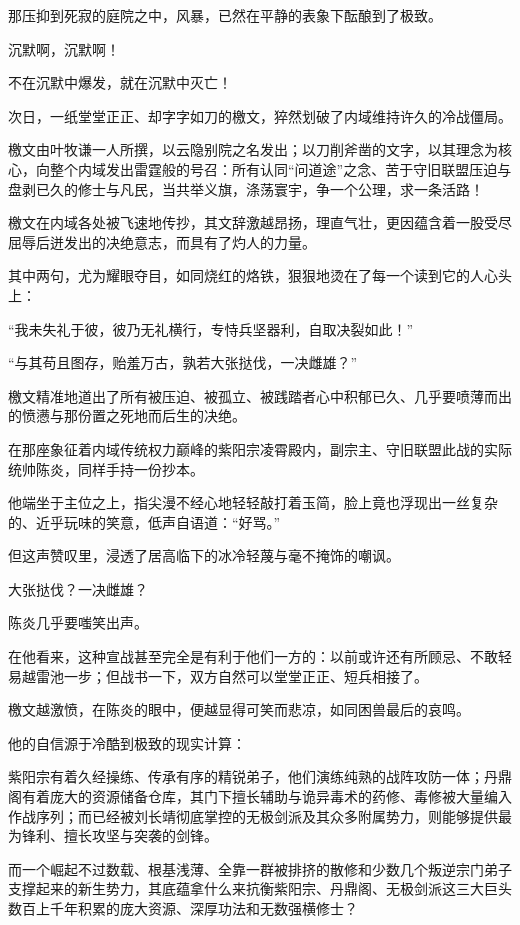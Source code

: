 那压抑到死寂的庭院之中，风暴，已然在平静的表象下酝酿到了极致。

沉默啊，沉默啊！

不在沉默中爆发，就在沉默中灭亡！

\vspace{2em}

次日，一纸堂堂正正、却字字如刀的檄文，猝然划破了内域维持许久的冷战僵局。

檄文由叶牧谦一人所撰，以云隐别院之名发出；以刀削斧凿的文字，以其理念为核心，向整个内域发出雷霆般的号召：所有认同“问道途”之念、苦于守旧联盟压迫与盘剥已久的修士与凡民，当共举义旗，涤荡寰宇，争一个公理，求一条活路！

檄文在内域各处被飞速地传抄，其文辞激越昂扬，理直气壮，更因蕴含着一股受尽屈辱后迸发出的决绝意志，而具有了灼人的力量。

其中两句，尤为耀眼夺目，如同烧红的烙铁，狠狠地烫在了每一个读到它的人心头上：

“我未失礼于彼，彼乃无礼横行，专恃兵坚器利，自取决裂如此！”

“与其苟且图存，贻羞万古，孰若大张挞伐，一决雌雄？”

檄文精准地道出了所有被压迫、被孤立、被践踏者心中积郁已久、几乎要喷薄而出的愤懑与那份置之死地而后生的决绝。

\vspace{2em}

在那座象征着内域传统权力巅峰的紫阳宗凌霄殿内，副宗主、守旧联盟此战的实际统帅陈炎，同样手持一份抄本。

他端坐于主位之上，指尖漫不经心地轻轻敲打着玉简，脸上竟也浮现出一丝复杂的、近乎玩味的笑意，低声自语道：“好骂。”

但这声赞叹里，浸透了居高临下的冰冷轻蔑与毫不掩饰的嘲讽。

大张挞伐？一决雌雄？

陈炎几乎要嗤笑出声。

在他看来，这种宣战甚至完全是有利于他们一方的：以前或许还有所顾忌、不敢轻易越雷池一步；但战书一下，双方自然可以堂堂正正、短兵相接了。

檄文越激愤，在陈炎的眼中，便越显得可笑而悲凉，如同困兽最后的哀鸣。

他的自信源于冷酷到极致的现实计算：

紫阳宗有着久经操练、传承有序的精锐弟子，他们演练纯熟的战阵攻防一体；丹鼎阁有着庞大的资源储备仓库，其门下擅长辅助与诡异毒术的药修、毒修被大量编入作战序列；而已经被刘长靖彻底掌控的无极剑派及其众多附属势力，则能够提供最为锋利、擅长攻坚与突袭的剑锋。

而一个崛起不过数载、根基浅薄、全靠一群被排挤的散修和少数几个叛逆宗门弟子支撑起来的新生势力，其底蕴拿什么来抗衡紫阳宗、丹鼎阁、无极剑派这三大巨头数百上千年积累的庞大资源、深厚功法和无数强横修士？

